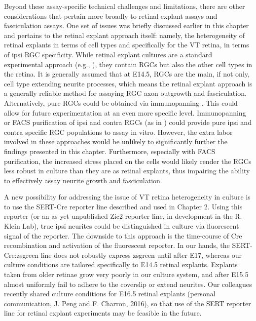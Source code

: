 Beyond these assay-specific technical challenges and limitations, there are other considerations that pertain more broadly to retinal explant assays and fasciculation assays.
One set of issues was briefly discussed earlier in this chapter and pertains to the retinal explant approach itself: namely, the heterogeneity of retinal explants in terms of cell types and specifically for the VT retina, in terms of ipsi RGC specificity.
While retinal explant cultures are a standard experimental approach (e.g., ), they contain RGCs but also the other cell types in the retina.
It is generally assumed that at E14.5, RGCs are the main, if not only, cell type extending neurite processes, which means the retinal explant approach is a generally reliable method for assaying RGC axon outgrowth and fasciculation.
Alternatively, pure RGCs could be obtained via immunopanning \cite{barres1988immunological}.
This could allow for future experimentation at an even more specific level.
Immunopanning or FACS purification of ipsi and contra RGCs (as in ) could provide pure ipsi and contra specific RGC populations to assay in vitro.
However, the extra labor involved in these approaches would be unlikely to significantly further the findings presented in this chapter.
Furthermore, especially with FACS purification, the increased stress placed on the cells would likely render the RGCs less robust in culture than they are as retinal explants, thus impairing the ability to effectively assay neurite growth and fasciculation.

A new possibility for addressing the issue of VT retina heterogeneity in culture is to use the SERT-Cre reporter line described and used in Chapter 2.
Using this reporter (or an as yet unpublished Zic2 reporter line, in development in the R. Klein Lab), true ipsi neurites could be distinguished in culture via fluorescent signal of the reporter.
The downside to this approach is the time-course of Cre recombination and activation of the fluorescent reporter.
In our hands, the SERT-Cre:zsgreen line does not robustly express zsgreen until after E17, whereas our culture conditions are tailored specifically to E14.5 retinal explants.
Explants taken from older retinae grow very poorly in our culture system, and after E15.5 almost uniformly fail to adhere to the coverslip or extend neurites.
Our colleagues recently shared culture conditions for E16.5 retinal explants (personal communication, J. Peng and F. Charron, 2016), so that use of the SERT reporter line for retinal explant experiments may be feasible in the future.

